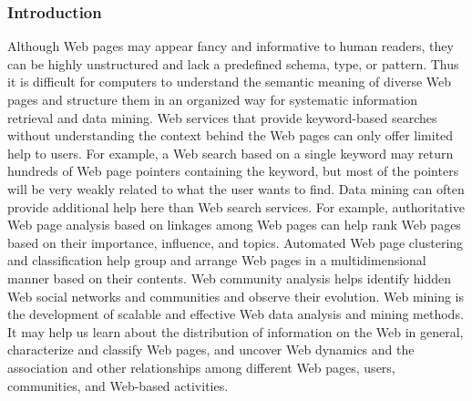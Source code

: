 \begin{frame}
    \frametitle{Introduction}
    \begin{minipage}{\textwidth}        
        Although Web pages may appear fancy and informative to human readers, they can be
        highly unstructured and lack a predefined schema, type, or pattern. Thus it is difficult for
        computers to understand the semantic meaning of diverse Web pages and structure them
        in an organized way for systematic information retrieval and data mining. Web services
        that provide keyword-based searches without understanding the context behind the Web
        pages can only offer limited help to users. For example, a Web search based on a single
        keyword may return hundreds of Web page pointers containing the keyword, but most
        of the pointers will be very weakly related to what the user wants to find. Data mining
        can often provide additional help here than Web search services. For example, authoritative
        Web page analysis based on linkages among Web pages can help rank Web pages based on their importance, influence, and topics. Automated Web page clustering and
        classification help group and arrange Web pages in a multidimensional manner based
        on their contents. Web community analysis helps identify hidden Web social networks
        and communities and observe their evolution. Web mining is the development of scalable
        and effective Web data analysis and mining methods. It may help us learn about the
        distribution of information on the Web in general, characterize and classify Web pages,
        and uncover Web dynamics and the association and other relationships among different
        Web pages, users, communities, and Web-based activities.
    \end{minipage}
\end{frame}
